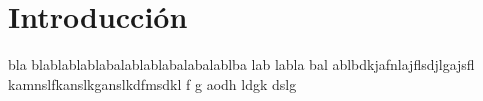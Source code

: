 \chapter{Introducci\'on}

bla blablablablabalablablabalabalablba lab labla bal ablbdkjafnlajflsdjlgajsfl kamnslfkanslkganslkdfmsdkl f
g aodh ldgk dslg 
